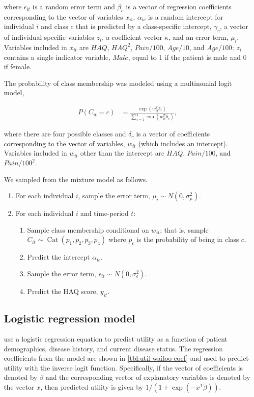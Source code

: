 \documentclass[11pt,final,fleqn]{article}
\theoremstyle{plain}
\DeclareMathOperator{\Cat}{Cat}
\begin{document}
\begin{appendices}
where $\epsilon_{it}$ is a random error term and $\beta_{c}$ is a vector of regression coefficients corresponding to the vector of variables $x_{it}$. $\alpha_{ic}$ is a random intercept for individual $i$ and class $c$ that is predicted by a class-specific intercept, $\gamma_c$, a vector of individual-specific variables $z_{i}$, a coefficient vector $\kappa$, and an error term, $\mu_i$. Variables included in $x_{it}$ are $HAQ$, $HAQ^2$, $Pain/100$, $Age/10$, and $Age/100$; $z_{i}$ contains a single indicator variable, $Male$, equal to 1 if the patient is male and 0 if female.

The probability of class membership was modeled using a multinomial logit model,

\begin{align}
P(C_{it} = c) &= \frac{\exp(w_{it}^T\delta_c)}{\sum_{s=1}^{4}\exp(w_{it}^T\delta_s)},
\end{align}

where there are four possible classes and $\delta_c$ is a vector of coefficients corresponding to the vector of variables, $w_{it}$ (which includes an intercept). Variables included in $w_{it}$ other than the intercept are $HAQ$, $Pain/100$, and $Pain/100^2$.

We sampled from the mixture model as follows.

\begin{enumerate}
\item For each individual $i$, sample the error term, $\mu_{i} \sim N(0, \sigma^2_\mu)$.
\item For each individual $i$ and time-period $t$: 
\begin{enumerate}
\item Sample class membership conditional on $w_{it}$; that is, sample $C_{it} \sim \Cat(p_1, p_2, p_3, p_4)$ where $p_c$ is the probability of being in class $c$.
\item Predict the intercept $\alpha_{ic}$.
\item Sample the error term, $\epsilon_{it} \sim N(0, \sigma^2_\epsilon)$.
\item Predict the HAQ score, $y_{it}$. 
\end{enumerate}
\end{enumerate}

\subsection{Logistic regression model}\label{app:sim-utility-logistic}
\citet{wailoo2006modeling} use a logistic regression equation to predict utility as a function of patient demographics, disease history, and current disease status. The regression coefficients from the model are shown in \autoref{tbl:util-wailoo-coef} and used to predict utility with the inverse logit function. Specifically, if the vector of coefficients is denoted by $\beta$ and the corresponding vector of explanatory variables is denoted by the vector $x$, then predicted utility is given by $1/(1 + \exp(-x^T\beta))$.



\end{appendices}
\end{document}
